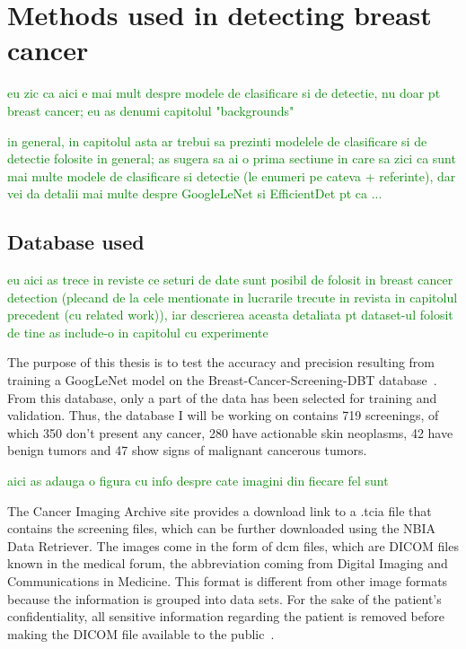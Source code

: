 \chapter{Methods used in detecting breast cancer}
\label{chap:ch4}
\textcolor{green}{eu zic ca aici e mai mult despre modele de clasificare si de detectie, nu doar pt breast cancer; eu as denumi capitolul "backgrounds"}

\textcolor{green}{in general, in capitolul asta ar trebui sa prezinti modelele de clasificare si de detectie folosite in general; as sugera sa ai o prima sectiune in care sa zici ca sunt mai multe modele de clasificare si detectie (le enumeri pe cateva + referinte), dar vei da detalii mai multe despre GoogleLeNet si EfficientDet pt ca ...}


\section{Database used}
\textcolor{green}{eu aici as trece in reviste ce seturi de date sunt posibil de folosit in breast cancer detection (plecand de la cele mentionate in lucrarile trecute in revista in capitolul precedent (cu related work)), iar descrierea aceasta detaliata pt dataset-ul folosit de tine as include-o in capitolul cu experimente}

The purpose of this thesis is to test the accuracy and precision resulting from training a GoogLeNet model on the Breast-Cancer-Screening-DBT database~\cite{link4}. From this database, only a part of the data has been selected for training and validation. Thus, the database I will be working on contains 719 screenings, of which 350 don't present any cancer, 280 have actionable skin neoplasms, 42 have benign tumors and 47 show signs of malignant cancerous tumors.

\textcolor{green}{aici as adauga o figura cu info despre cate imagini din fiecare fel sunt}

The Cancer Imaging Archive site provides a download link to a .tcia file that contains the screening files, which can be further downloaded using the NBIA Data Retriever. The images come in the form of dcm files, which are DICOM files known in the medical forum, the abbreviation coming from Digital Imaging and Communications in Medicine.
This format is different from other image formats because the information is grouped into data sets. For the sake of the patient's confidentiality, all sensitive information regarding the patient is removed before making the DICOM file available to the public~\cite{carte6}.

